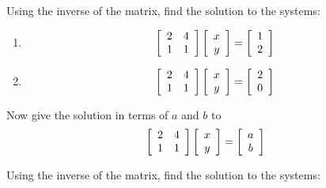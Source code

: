\begin{enumialphparenastyle}
\begin{ex}Using the inverse of the matrix, find the solution to the systems:
\begin{enumerate}
\item
\begin{equation*}
\left[
\begin{array}{rr}
2 & 4  \\
1 & 1 
\end{array}
\right] 
\left[
\begin{array}{c}
x \\
y
\end{array}
\right] =\left[
\begin{array}{r}
1 \\
2 
\end{array}
\right]
\end{equation*}

\item
\begin{equation*}
\left[
\begin{array}{rr}
2 & 4 \\
1 & 1 
\end{array}
\right] \left[
\begin{array}{c}
x \\
y 
\end{array}
\right] =\left[
\begin{array}{r}
2 \\
0 
\end{array}
\right] 
\end{equation*}
\end{enumerate}

Now give the solution in terms of $a$ and $b$ to
\[
\left[
\begin{array}{rr}
2 & 4 \\
1 & 1 
\end{array} \right]
\left[
\begin{array}{c}
x \\
y
\end{array}\right]
=
\left[
\begin{array}{c}
a \\
b
\end{array} \right]
\]
\end{ex}

\begin{ex}Using the inverse of the matrix, find the solution to the systems: 


\end{ex}
\end{enumialphparenastyle}
